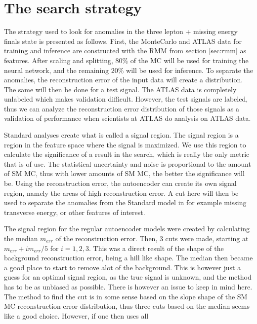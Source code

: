 \section{The search strategy}\label{sec:strategy}
The strategy used to look for anomalies in the three lepton + missing energy finals state is presented as follows. 
First, the MonteCarlo and ATLAS data for training and inference are constructed with the RMM from section 
\ref{sec:rmm} as features. After scaling and splitting, $80\%$ of the MC will be used for training the neural 
network, and the remaining $20\%$ will be used for inference. To separate the anomalies, the reconstruction 
error of the input data will create a distribution. The same will then be done for a test signal. The ATLAS data 
is completely unlabeled which makes validation difficult. However, the test signals are labeled, thus we can 
analyze the reconstruction error distribution of those signals as a validation of performance when scientists at 
ATLAS do analysis on ATLAS data. \par
Standard analyses create what is called a signal region. The signal region is a region in the feature space where 
the signal is maximized. We use this region to calculate the significance of a result in the search, which is 
really the only metric that is of use. The statistical uncertainty and noise is proportional to the amount of SM MC, 
thus with lower amounts of SM MC, the better the significance will be. Using the reconstruction error, the autoencoder 
can create its own signal region, namely the areas of high reconstruction error. A cut here will then be used to 
separate the anomalies from the Standard model in for example missing transverse energy, or other features of interest. \par 
The signal region for the regular autoencoder models were created by calculating the median $m_{err}$ of the 
reconstruction error. Then, 3 cuts were made, starting at $m_{err} + im_{err}/5$ for $i = 1,2,3$. This was a direct 
result of the shape of the background reconstruction error, being a hill like shape. The median then became a 
good place to start to remove alot of the background. This is however just a guess for an optimal signal region, 
as the true signal is unknown, and the method has to be as unbiased as possible. There is however an issue to keep 
in mind here. The method to find the cut is in some sense based on the slope shape of the SM MC reconstruction 
error distribution, thus three cuts based on the median seems like a good choice. However, if one then uses all 

